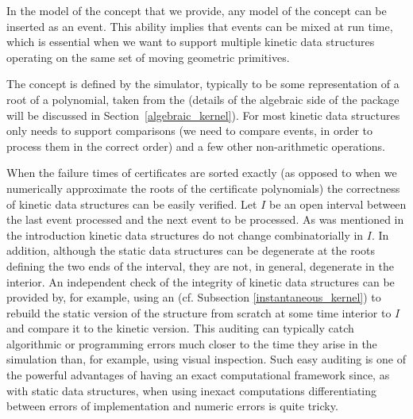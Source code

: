 In the model of the  concept that we provide, any
model of the  concept can be inserted as an event. This
ability implies that events can be mixed at run time, which is
essential when we want to support multiple kinetic data structures
operating on the same set of moving geometric primitives.

The  concept is defined by the simulator, typically to be
some representation of a root of a polynomial, taken from the
 (details of the algebraic side of the package
will be discussed in Section~\ref{algebraic_kernel}). For most
kinetic data structures  only needs to support
comparisons (we need to compare events, in order to process them in
the correct order) and a few other non-arithmetic operations.

When the failure times of certificates are sorted exactly (as opposed
to when we numerically approximate the roots of the certificate
polynomials) the correctness of kinetic data structures can be easily
verified.  Let $I$ be an open interval between the last event
processed and the next event to be processed.  As was mentioned in the
introduction kinetic data structures do not change combinatorially in
$I$. In addition, although the static data structures can be
degenerate at the roots defining the two ends of the interval, they
are not, in general, degenerate in the interior. An independent check
of the integrity of kinetic data structures can be provided by, for
example, using an  (cf. Subsection
\ref{instantaneous_kernel}) to rebuild the static version of the
structure from scratch at some time interior to $I$ and compare it to
the kinetic version. This auditing can typically catch algorithmic or
programming errors much closer to the time they arise in the
simulation than, for example, using visual inspection.  Such easy
auditing is one of the powerful advantages of having an exact
computational framework since, as with static data structures, when
using inexact computations differentiating between errors of
implementation and numeric errors is quite tricky.

